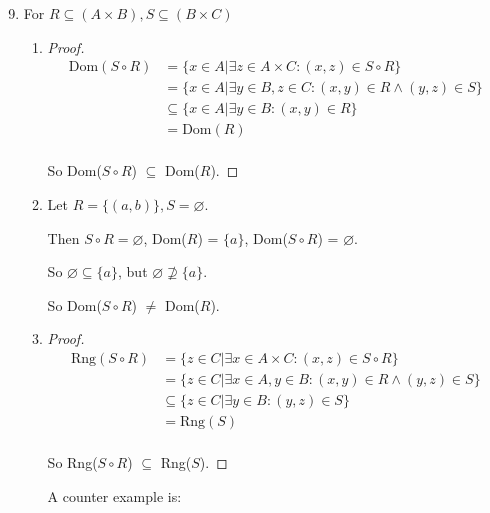 \documentclass[12pt,letterpaper]{article}
\begin{document}
\begin{enumerate}
\begin{enumerate}
        \setcounter{enumii}{8}
        \item
          For $R \subseteq (A \times B), S \subseteq (B \times C)$
          \begin{enumerate}
            \item
              \begin{proof}
                \begin{align*}
                  \text{Dom}(S \circ R)
                  &= \{x \in A | \exists z \in A \times C : (x, z) \in S \circ R\} \\
                  &= \{x \in A | \exists y \in B, z \in C : (x, y) \in R \land (y, z) \in S\} \\
                  &\subseteq \{x \in A | \exists y \in B : (x, y) \in R\} \\
                  &= \text{Dom}(R) \\
                \end{align*}

                So Dom($S \circ R$) $\subseteq$ Dom($R$).
              \end{proof}
            \item
              Let $R = \{(a, b)\}, S = \varnothing$.

              Then $S \circ R = \varnothing$, Dom($R$) = $\{a\}$, Dom($S \circ R$) = $\varnothing$.

              So $\varnothing \subseteq \{a\}$, but $\varnothing \not\supseteq \{a\}$.

              So Dom($S \circ R$) $\neq$ Dom($R$).
            \item
              \begin{proof}
                \begin{align*}
                  \text{Rng}(S \circ R)
                  &= \{z \in C | \exists x \in A \times C : (x, z) \in S \circ R\} \\
                  &= \{z \in C | \exists x \in A, y \in B : (x, y) \in R \land (y, z) \in S\} \\
                  &\subseteq \{z \in C | \exists y \in B : (y, z) \in S\} \\
                  &= \text{Rng}(S) \\
                \end{align*}

                So Rng($S \circ R$) $\subseteq$ Rng($S$).
              \end{proof}

              A counter example is:


\end{enumerate}
\end{enumerate}
\end{enumerate}
\end{document}
